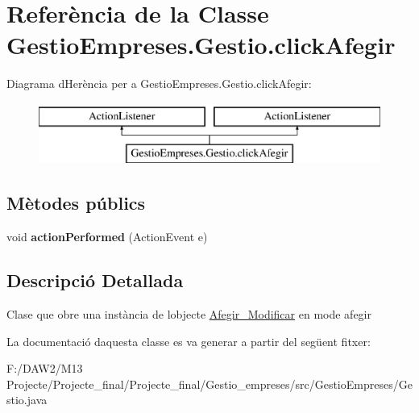 \hypertarget{class_gestio_empreses_1_1_gestio_1_1click_afegir}{}\section{Referència de la Classe Gestio\+Empreses.\+Gestio.\+click\+Afegir}
\label{class_gestio_empreses_1_1_gestio_1_1click_afegir}
Diagrama d\textquotesingle{}Herència per a Gestio\+Empreses.\+Gestio.\+click\+Afegir\+:\begin{figure}[H]
\begin{center}
\leavevmode
\includegraphics[height=2.000000cm]{class_gestio_empreses_1_1_gestio_1_1click_afegir}
\end{center}
\end{figure}
\subsection*{Mètodes públics}
\begin{DoxyCompactItemize}
\item 
\mbox{\label{class_gestio_empreses_1_1_gestio_1_1click_afegir_ab398da6d59ddb2275d210cb17a528f7c}} 
void {\bfseries action\+Performed} (Action\+Event e)
\end{DoxyCompactItemize}


\subsection{Descripció Detallada}
Clase que obre una instància de l\textquotesingle{}objecte \mbox{\hyperlink{class_gestio_empreses_1_1_afegir___modificar}{Afegir\+\_\+\+Modificar}} en mode afegir 

La documentació d\textquotesingle{}aquesta classe es va generar a partir del següent fitxer\+:\begin{DoxyCompactItemize}
\item 
F\+:/\+D\+A\+W2/\+M13 Projecte/\+Projecte\+\_\+final/\+Projecte\+\_\+final/\+Gestio\+\_\+empreses/src/\+Gestio\+Empreses/Gestio.\+java\end{DoxyCompactItemize}
